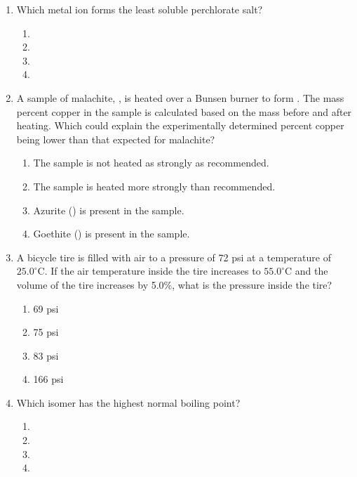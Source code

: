 \documentclass[twocolumn,10pt]{article}
\begin{document}
\begin{enumerate}[label=\arabic*., leftmargin=*]
\item Which metal ion forms the least soluble perchlorate salt?
\begin{enumerate}[label=(\Alph*)]
    \item {} \item {} \item {} \item {}
\end{enumerate}

\item A sample of malachite, , is heated over a Bunsen burner to form . The mass percent copper in the sample is calculated based on the mass before and after heating. Which could explain the experimentally determined percent copper being lower than that expected for malachite?
\begin{enumerate}[label=(\Alph*)]
    \item The sample is not heated as strongly as recommended.
    \item The sample is heated more strongly than recommended.
    \item Azurite () is present in the sample.
    \item Goethite () is present in the sample.
\end{enumerate}

\item A bicycle tire is filled with air to a pressure of 72 psi at a temperature of $25.0^\circ\text{C}$. If the air temperature inside the tire increases to $55.0^\circ\text{C}$ and the volume of the tire increases by 5.0\%, what is the pressure inside the tire?
\begin{enumerate}[label=(\Alph*)]
    \item 69 psi \item 75 psi \item 83 psi \item 166 psi
\end{enumerate}

\item Which  isomer has the highest normal boiling point?
\begin{enumerate}[label=(\Alph*)]
    \item {}
    \item {}
    \item {}
    \item {}
\end{enumerate}


\end{enumerate}
\end{document}

